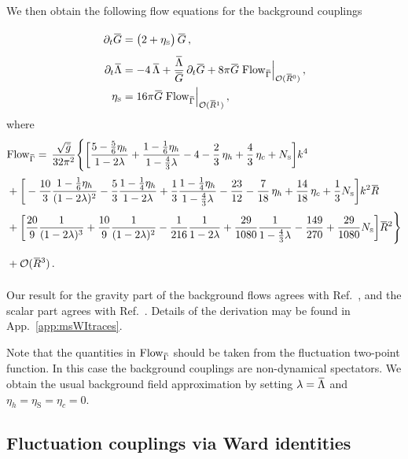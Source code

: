 \documentclass[11pt]{book}
\newcommand{\overbar}[1]{\mkern 1.5mu\overline{\mkern-1.5mu#1\mkern-1.5mu}\mkern 1.5mu}
\newcommand\etaS{ \eta_{\scriptscriptstyle{\mathrm{S}}} }
\newcommand\NS{ N_{\scriptscriptstyle{\mathrm{S}}} }
\newcommand{\bR}{\overbar R}
\newcommand\Gback{ \overbar{G} } %
\newcommand\Lback{ \overbar{\Lambda} } %
\newcommand{\Flow}{\mathrm{Flow}}
\numberwithin{equation}{chapter}
\begin{document}
We then obtain the following flow equations for the background couplings
\begin{align}
  \vphantom{ \frac{\Lback}{\Gback} }
  \partial_t \Gback
  &= \big( 2 + \etaS \big) \, \Gback \,, \\
  \vphantom{ \frac{\Lback}{\Gback} }
  \partial_t \Lback
  &= - 4 \, \Lback + \frac{\Lback}{\Gback} \, \partial_t \Gback
  + 8 \pi \Gback \; \Flow_{\overbar \Gamma} \Big|_{\mathcal O(\bR^0)} \,, \\
  \etaS &=
   16 \pi \Gback \; \Flow_{\overbar \Gamma} \Big|_{\mathcal O(\bR^1)} \,,
\end{align}
where
\begin{align}
  &\Flow_{\overbar \Gamma} = \, \frac{ \sqrt {\bar g} }{ 32 \pi^2 }
  \Bigg\lbrace
    \bigg[
        \frac{5 - \frac{5}{6} \eta_h}{1 - 2 \lambda}
      + \frac{1 - \frac{1}{6} \eta_h}{1 - \frac 43 \lambda}
      - 4
      - \frac{2}{3} \, \eta_h
      + \frac{4}{3} \, \eta_c
      + \NS
    \bigg] k^4
    \notag \\
    \vphantom{ \Bigg\lbrace }
    &+ \bigg[
      - \frac{10}{3} \frac{1 - \frac{1}{6} \eta_h}{(1 - 2 \lambda)^2}
      - \frac{5}{3} \frac{1 - \frac{1}{4} \eta_h}{1 - 2 \lambda}
      + \frac{1}{3} \frac{1 - \frac{1}{4} \eta_h}{1 - \frac 43 \lambda}
      - \frac{23}{12}
      - \frac{7}{18} \, \eta_h
      + \frac{14}{18} \, \eta_c
      + \frac {1}{3} \NS
    \bigg] k^2 \bR
    \notag \\
    \vphantom{ \Bigg\lbrace }
    &+ \bigg[
        \frac{20}{9} \frac{1}{(1 - 2 \lambda)^3}
      + \frac{10}{9} \frac{1}{(1 - 2 \lambda)^2}
      - \frac{1}{216} \frac{1}{1 - 2 \lambda}
      + \frac{29}{1080} \frac{1}{1 - \frac 43 \lambda}
      - \frac{149}{270}
      + \frac {29}{1080} \NS
    \bigg] \bR^2
  \Bigg\rbrace
    \notag \\
    \vphantom{ \Bigg\lbrace }
    &+ \mathcal O (\bR^3) \,.
\end{align}
Our result for the gravity part of the background flows agrees with Ref.~\cite{Gies:2015tca},
and the scalar part agrees with Ref.~\cite{Dona:2013qba}.
Details of the derivation may be found in App.~\ref{app:msWItraces}.

Note that the quantities in $\Flow_{\overbar \Gamma}$ should be taken
from the fluctuation two-point function.
In this case the background couplings are non-dynamical spectators.
We obtain the usual background field approximation
by setting $\lambda=\Lback$ and $\eta_h=\etaS=\eta_c=0$.

\subsection{Fluctuation couplings via Ward identities}
\end{document}
